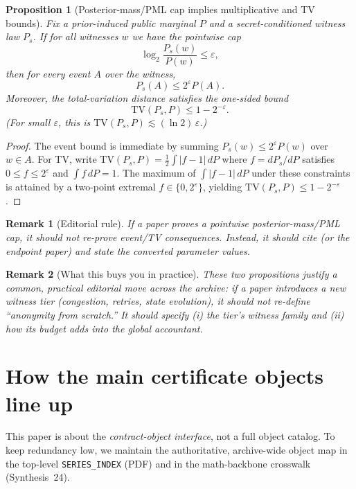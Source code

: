 \documentclass[11pt]{article}
\newtheorem{proposition}{Proposition}
\newtheorem{remark}{Remark}
\newcommand{\TV}{\mathrm{TV}}
\newcommand{\eps}{\varepsilon}
\newcommand{\logtwo}{\log_2}
\begin{document}
\begin{proposition}[Posterior-mass/PML cap implies multiplicative and TV bounds]\label{prop:oi_to_tv}
Fix a prior-induced public marginal $P$ and a secret-conditioned witness law $P_s$.
If for all witnesses $w$ we have the pointwise cap
\[
\logtwo\frac{P_s(w)}{P(w)} \le \eps,
\]
then for every event $A$ over the witness,
\[
P_s(A)\le 2^{\eps} P(A).
\]
Moreover, the total-variation distance satisfies the one-sided bound
\[
\TV(P_s,P)\le 1-2^{-\eps}.
\]
(For small $\eps$, this is $\TV(P_s,P)\lesssim (\ln 2)\,\eps$.)
\end{proposition}

\begin{proof}
The event bound is immediate by summing $P_s(w)\le 2^{\eps}P(w)$ over $w\in A$.
For TV, write $\TV(P_s,P)=\tfrac12\int |f-1|\,dP$ where $f=dP_s/dP$ satisfies $0\le f\le 2^{\eps}$ and $\int f\,dP=1$.
The maximum of $\int |f-1|\,dP$ under these constraints is attained by a two-point extremal $f\in\{0,2^{\eps}\}$, yielding $\TV(P_s,P)\le 1-2^{-\eps}$.
\end{proof}

\begin{remark}[Editorial rule]
If a paper proves a pointwise posterior-mass/PML cap, it should \emph{not} re-prove event/TV consequences.
Instead, it should cite  (or the endpoint paper) and state the converted parameter values.
\end{remark}

\begin{remark}[What this buys you in practice]

These two propositions justify a common, practical editorial move across the archive:
if a paper introduces a \emph{new witness tier} (congestion, retries, state evolution),
it should not re-define ``anonymity from scratch.'' It should specify (i) the tier's witness family and (ii) how its budget
adds into the global accountant.
\end{remark}

\section{How the main certificate objects line up}

This paper is about the \emph{contract-object interface}, not a full object catalog.
To keep redundancy low, we maintain the authoritative, archive-wide object map in the top-level \texttt{SERIES\_INDEX} (PDF) and in the math-backbone crosswalk (Synthesis~24).\cite{series:mathcrosswalk}
\end{document}
